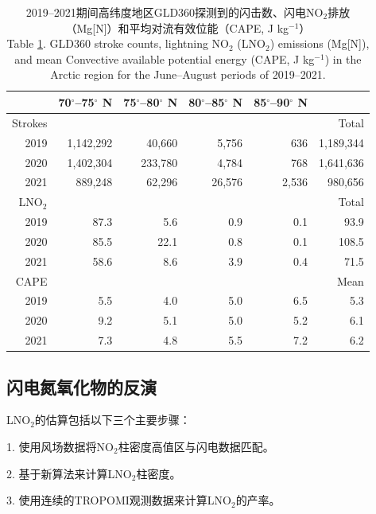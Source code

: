 \begin{table}
\centering
\caption{2019--2021期间高纬度地区GLD360探测到的闪击数、闪电NO$_2$排放（Mg[N]）和平均对流有效位能（CAPE, J kg$^{-1}$）\\
Table \ref{table:arctic_emission}. GLD360 stroke counts, lightning NO$_2$ (LNO$_2$) emissions (Mg[N]), and mean Convective available potential energy (CAPE, J kg$^{-1}$) in the Arctic region for the June--August periods of 2019--2021.
}
\label{table:arctic_emission}
\begin{tabular}{rrrrrr}
\hline
{} & 70$^{\circ}$--75$^{\circ}$ N & 75$^{\circ}$--80$^{\circ}$ N &
80$^{\circ}$--85$^{\circ}$ N &  85$^{\circ}$--90$^{\circ}$ N &  \\
\hline
Strokes & & & & & Total \\
\hline
2019 &   1,142,292 &     40,660 &      5,756 &       636  & 1,189,344 \\
2020 &   1,402,304 &    233,780 &      4,784 &       768  &  1,641,636 \\
2021 &     889,248 &     62,296 &     26,576 &      2,536  &  980,656 \\
\hline
LNO$_2$ & & & & & Total \\
\hline
2019 &      87.3 &       5.6 &       0.9 &       0.1 &   93.9 \\
2020 &      85.5 &      22.1 &       0.8 &       0.1 &  108.5 \\
2021 &      58.6 &       8.6 &       3.9 &       0.4 &   71.5 \\
\hline
CAPE & & & & & Mean \\
\hline
2019 & 5.5  & 4.0  & 5.0  & 6.5 & 5.3 \\
2020 & 9.2  & 5.1  & 5.0  & 5.2 & 6.1 \\
2021 & 7.3  & 4.8  & 5.5  & 7.2 & 6.2 \\
\hline
\end{tabular}
\end{table}


\subsection{闪电氮氧化物的反演}

LNO$_2$的估算包括以下三个主要步骤：

1. 使用风场数据将NO$_2$柱密度高值区与闪电数据匹配。

2. 基于新算法来计算LNO$_2$柱密度。

3. 使用连续的TROPOMI观测数据来计算LNO$_2$的产率。

